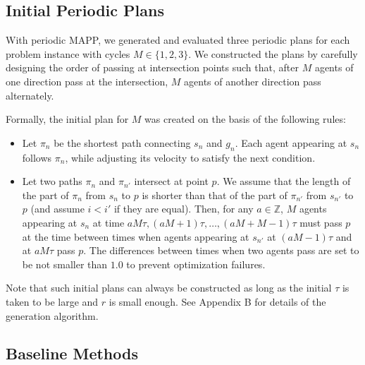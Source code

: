\documentclass[letterpaper]{article} %
\begin{document}
\subsection{Initial Periodic Plans}
With periodic MAPP, we generated and evaluated three periodic plans for each problem instance with cycles $M \in \{1, 2, 3\}$.
We constructed the plans by carefully designing the order of passing at intersection points such that, after $M$ agents of one direction pass at the intersection, $M$ agents of another direction pass alternately. 

Formally, the initial plan for $M$ was created on the basis of the following rules:
\begin{itemize}
    \item Let $\pi_n$ be the shortest path connecting $s_n$ and $g_n$. Each agent appearing at $s_n$ follows $\pi_n$, while adjusting its velocity to satisfy the next condition. 
    \item Let two paths $\pi_n$ and $\pi_{n'}$ intersect at point $p$. We assume that the length of the part of $\pi_n$ from $s_n$ to $p$ is shorter than that of the part of $\pi_{n'}$ from $s_{n'}$ to $p$ (and assume $i<i'$ if they are equal). Then, for any $a \in \mathbb{Z}$, $M$ agents appearing at $s_n$ at time $aM\tau, (aM+1)\tau, \ldots, (aM+M-1)\tau$ must pass $p$ at the time between times when agents appearing at $s_{n'}$ at $(aM-1)\tau$ and at $aM\tau$ pass $p$. The differences between times when two agents pass are set to be not smaller than $1.0$ to prevent optimization failures.

\end{itemize}
Note that such initial plans can always be constructed as long as the initial $\tau$ is taken to be large and $r$ is small enough. See Appendix B for details of the generation algorithm.

\subsection{Baseline Methods}
\end{document}
